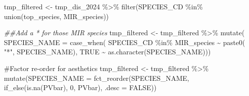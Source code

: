 \documentclass[
]{article}
\newenvironment{Shaded}{\begin{snugshade}}{\end{snugshade}}
\newcommand{\AttributeTok}[1]{\textcolor[rgb]{0.40,0.45,0.13}{#1}}
\newcommand{\CommentTok}[1]{\textcolor[rgb]{0.37,0.37,0.37}{#1}}
\newcommand{\ConstantTok}[1]{\textcolor[rgb]{0.56,0.35,0.01}{#1}}
\newcommand{\DecValTok}[1]{\textcolor[rgb]{0.68,0.00,0.00}{#1}}
\newcommand{\DocumentationTok}[1]{\textcolor[rgb]{0.37,0.37,0.37}{\textit{#1}}}
\newcommand{\FunctionTok}[1]{\textcolor[rgb]{0.28,0.35,0.67}{#1}}
\newcommand{\NormalTok}[1]{\textcolor[rgb]{0.00,0.23,0.31}{#1}}
\newcommand{\OtherTok}[1]{\textcolor[rgb]{0.00,0.23,0.31}{#1}}
\newcommand{\SpecialCharTok}[1]{\textcolor[rgb]{0.37,0.37,0.37}{#1}}
\newcommand{\StringTok}[1]{\textcolor[rgb]{0.13,0.47,0.30}{#1}}
\begin{document}
\begin{Shaded}
\begin{Highlighting}[]
\NormalTok{tmp\_filtered }\OtherTok{\textless{}{-}}\NormalTok{ tmp\_dis\_2024 }\SpecialCharTok{\%\textgreater{}\%}
  \FunctionTok{filter}\NormalTok{(SPECIES\_CD }\SpecialCharTok{\%in\%} \FunctionTok{union}\NormalTok{(top\_species, MIR\_species)) }

\DocumentationTok{\#\#Add a * for those MIR species}
\NormalTok{tmp\_filtered }\OtherTok{\textless{}{-}}\NormalTok{ tmp\_filtered }\SpecialCharTok{\%\textgreater{}\%} \FunctionTok{mutate}\NormalTok{(}
  \AttributeTok{SPECIES\_NAME =} \FunctionTok{case\_when}\NormalTok{(}
\NormalTok{    SPECIES\_CD }\SpecialCharTok{\%in\%}\NormalTok{ MIR\_species }\SpecialCharTok{\textasciitilde{}} \FunctionTok{paste0}\NormalTok{( }\StringTok{"*"}\NormalTok{, SPECIES\_NAME),}
    \ConstantTok{TRUE} \SpecialCharTok{\textasciitilde{}} \FunctionTok{as.character}\NormalTok{(SPECIES\_NAME)))}

\CommentTok{\#Factor re{-}order for aesthetics  }
\NormalTok{tmp\_filtered }\OtherTok{\textless{}{-}}\NormalTok{ tmp\_filtered }\SpecialCharTok{\%\textgreater{}\%}
  \FunctionTok{mutate}\NormalTok{(}\AttributeTok{SPECIES\_NAME =} 
           \FunctionTok{fct\_reorder}\NormalTok{(SPECIES\_NAME, }\FunctionTok{if\_else}\NormalTok{(}\FunctionTok{is.na}\NormalTok{(PVbar), }\DecValTok{0}\NormalTok{, PVbar), }\AttributeTok{.desc =} \ConstantTok{FALSE}\NormalTok{))}


\end{Highlighting}
\end{Shaded}
\end{document}

